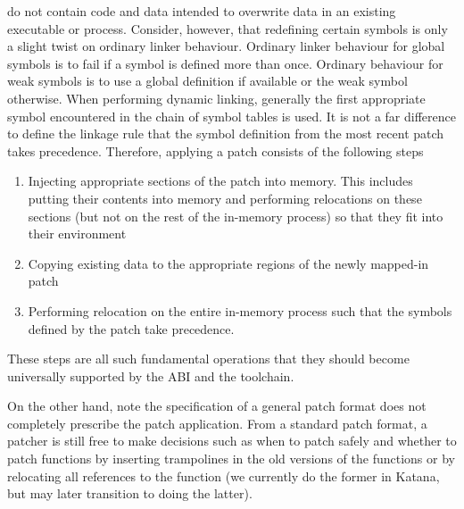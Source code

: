 \documentclass[a4paper,12pt]{article}
\begin{document}
do not contain code and data intended to overwrite data in an existing
executable or process. Consider, however, that redefining certain
symbols is only a slight twist on ordinary linker behaviour. Ordinary
linker behaviour for global symbols is to fail if a symbol is defined
more than once. Ordinary behaviour for weak symbols is to use a global
definition if available or the weak symbol otherwise. When performing
dynamic linking, generally the first appropriate symbol encountered in
the chain of symbol tables is used. It is not a far difference to
define the linkage rule that the symbol definition from the most
recent patch takes precedence. Therefore, applying a patch consists of
the following steps
\begin{enumerate}
\item Injecting appropriate sections of the patch into memory. This
includes putting their contents into memory and performing relocations
on these sections (but not on the rest of the in-memory process) so
that they fit into their environment
\item Copying existing data to the appropriate regions of the newly
mapped-in patch
\item Performing relocation on the entire in-memory process such that the
symbols defined by the patch take precedence.
\end{enumerate}
These steps are all such fundamental operations that they should
become universally supported by the ABI and the toolchain. 

On the other hand, note the specification of a general patch
format does not completely prescribe the patch application. From a
standard patch format, a patcher is still free to make decisions such
as when to patch safely and whether to patch functions by inserting
trampolines in the old versions of the functions or by relocating all
references to the function (we currently do the former in Katana, but
may later transition to doing the latter).
\end{document}
